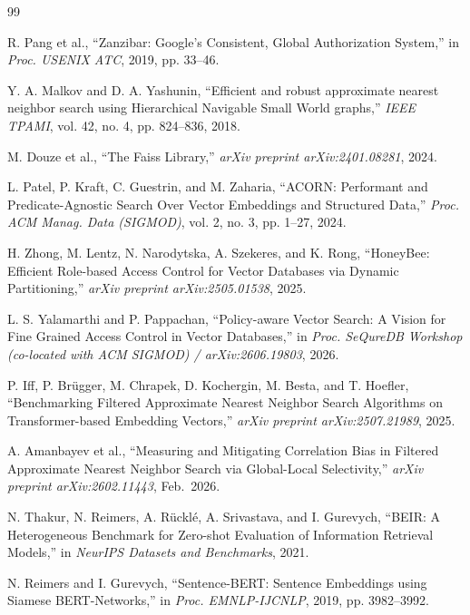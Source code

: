 \documentclass[conference]{IEEEtran}
\begin{document}
\begin{thebibliography}{99}
\setlength{\itemsep}{-0.5pt}\setlength{\parskip}{0pt}

R. Pang et al., ``Zanzibar: Google's Consistent, Global Authorization System,'' in \textit{Proc. USENIX ATC}, 2019, pp. 33--46.

Y. A. Malkov and D. A. Yashunin, ``Efficient and robust approximate nearest neighbor search using Hierarchical Navigable Small World graphs,'' \textit{IEEE TPAMI}, vol. 42, no. 4, pp. 824--836, 2018.

M. Douze et al., ``The Faiss Library,'' \textit{arXiv preprint arXiv:2401.08281}, 2024.

L. Patel, P. Kraft, C. Guestrin, and M. Zaharia, ``ACORN: Performant and Predicate-Agnostic Search Over Vector Embeddings and Structured Data,'' \textit{Proc. ACM Manag. Data (SIGMOD)}, vol. 2, no. 3, pp. 1--27, 2024.

H. Zhong, M. Lentz, N. Narodytska, A. Szekeres, and K. Rong, ``HoneyBee: Efficient Role-based Access Control for Vector Databases via Dynamic Partitioning,'' \textit{arXiv preprint arXiv:2505.01538}, 2025.

L. S. Yalamarthi and P. Pappachan, ``Policy-aware Vector Search: A Vision for Fine Grained Access Control in Vector Databases,'' in \textit{Proc. SeQureDB Workshop (co-located with ACM SIGMOD) / arXiv:2606.19803}, 2026.

P. Iff, P. Br{\"u}gger, M. Chrapek, D. Kochergin, M. Besta, and T. Hoefler, ``Benchmarking Filtered Approximate Nearest Neighbor Search Algorithms on Transformer-based Embedding Vectors,'' \textit{arXiv preprint arXiv:2507.21989}, 2025.

A. Amanbayev et al., ``Measuring and Mitigating Correlation Bias in Filtered Approximate Nearest Neighbor Search via Global-Local Selectivity,'' \textit{arXiv preprint arXiv:2602.11443}, Feb.\ 2026.

N. Thakur, N. Reimers, A. R{\"u}ckl{\'e}, A. Srivastava, and I. Gurevych, ``BEIR: A Heterogeneous Benchmark for Zero-shot Evaluation of Information Retrieval Models,'' in \textit{NeurIPS Datasets and Benchmarks}, 2021.

N. Reimers and I. Gurevych, ``Sentence-BERT: Sentence Embeddings using Siamese BERT-Networks,'' in \textit{Proc. EMNLP-IJCNLP}, 2019, pp. 3982--3992.


\end{thebibliography}
\end{document}
